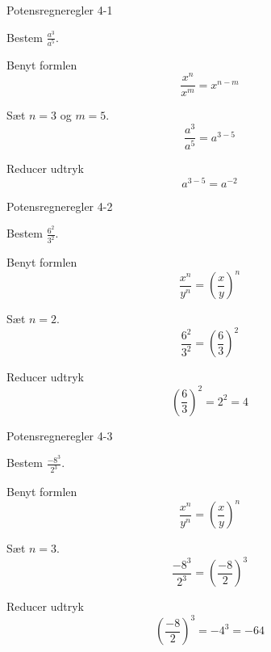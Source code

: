 \documentclass{article}
\begin{document}
\tableofcontents
\newpage

\begin{exercise}{Potensregneregler 4-1}

Bestem $\frac{a^3}{a^5}$.


\hint

Benyt formlen
\[
\frac{x^n}{x^m} = x^{n - m}
\]

\hint

Sæt $n = 3$ og $m=5$.
\[
\frac{a^3}{a^5} = a^{3 - 5}
\]

\hint

Reducer udtryk
\[
a^{3 - 5} = a^{-2}
\]
\end{exercise}

\newpage

\begin{exercise}{Potensregneregler 4-2}

Bestem $\frac{6^2}{3^2}$.


\hint

Benyt formlen
\[
\frac{x^n}{y^n} = \left( \frac{x}{y}\right)^n
\]

\hint

Sæt $n = 2$.
\[
\frac{6^2}{3^2} = \left(\frac{6}{3}\right)^2
\]

\hint

Reducer udtryk
\[
\left(\frac{6}{3}\right)^2 = 2^2 = 4
\]
\end{exercise}

\newpage

\begin{exercise}{Potensregneregler 4-3}

Bestem $\frac{-8^3}{2^3}$.


\hint

Benyt formlen
\[
\frac{x^n}{y^n} = \left( \frac{x}{y}\right)^n
\]

\hint

Sæt $n = 3$.
\[
\frac{-8^3}{2^3} = \left(\frac{-8}{2}\right)^3
\]

\hint

Reducer udtryk
\[
\left(\frac{-8}{2}\right)^3 = -4^3 = -64
\]
\end{exercise}

\newpage
\end{document}
